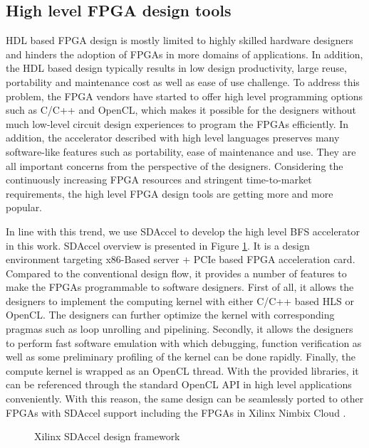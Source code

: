 \subsection{High level FPGA design tools}
HDL based FPGA design is mostly limited to 
highly skilled hardware designers and hinders 
the adoption of FPGAs in more domains of applications.
In addition, the HDL based design typically results in low design productivity, 
large reuse, portability and maintenance cost as well 
as ease of use challenge. 
To address this problem, the FPGA vendors have started 
to offer high level programming options such as C/C++ and OpenCL, which makes 
it possible for the designers without much low-level circuit design 
experiences \cite{nimbix, xilinx-sdaccel, intel-opencl} 
to program the FPGAs efficiently. In addition, the accelerator 
described with high level languages preserves many software-like features 
such as portability, ease of maintenance and use. They are all 
important concerns from the perspective of the designers. Considering the  
continuously increasing FPGA resources and stringent time-to-market requirements, 
the high level FPGA design tools \cite{Nane2016hls-survey} are getting more and more 
popular.

In line with this trend, we use SDAccel \cite{xilinx-sdaccel} to develop the 
high level BFS accelerator in this work. SDAccel overview is presented in 
Figure \ref{fig:sdaccel}. It is a design environment targeting x86-Based server + PCIe 
based FPGA acceleration card. Compared to the conventional design flow, it provides 
a number of features to make the FPGAs programmable to software designers. 
First of all, it allows the designers to implement the computing kernel with either 
C/C++ based HLS or OpenCL. The designers can further optimize the kernel with 
corresponding pragmas such as loop unrolling and pipelining. Secondly, it allows the 
designers to perform fast software emulation with which debugging, function verification 
as well as some preliminary profiling of the kernel can be done rapidly.
Finally, the compute kernel is wrapped as an OpenCL thread. With the provided libraries, it 
can be referenced through the standard OpenCL API in high level applications conveniently.
With this reason, the same design can be seamlessly 
ported to other FPGAs with SDAccel support including the FPGAs in 
Xilinx Nimbix Cloud \cite{nimbix}.     

\begin{figure}
    \caption{Xilinx SDAccel design framework \cite{xilinx-sdaccel}}
\label{fig:sdaccel}
\end{figure}


